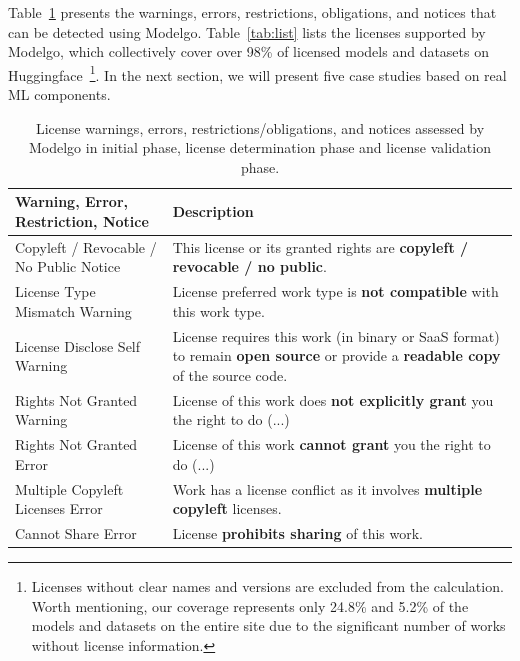 Table~\ref{tab:analysis} presents the warnings, errors, restrictions, obligations, and notices that can be detected using Modelgo.
Table~\ref{tab:list} lists the licenses supported by Modelgo, which collectively cover over 98\% of licensed models and datasets on Huggingface~\footnote{Licenses without clear names and versions are excluded from the calculation. Worth mentioning, our coverage represents only 24.8\% and 5.2\% of the models and datasets on the entire site due to the significant number of works without license information.}.
In the next section, we will present five case studies based on real ML components.


\begin{table}[t]
    \caption{License warnings, errors, restrictions/obligations, and notices assessed by Modelgo in \textcolor{Permissive}{initial phase}, \textcolor{Copyleft}{license determination phase} and license validation phase.}
    \scriptsize
    \label{tab:analysis}
    \begin{tabular}{|p{3.3cm}|p{4.3cm}|}

    \hline
    \rowcolor[gray]{.8}
    \textbf{Warning, Error, Restriction, Notice} & \textbf{Description} \\ \hline
    
    \textcolor{Permissive}{Copyleft / Revocable / No Public Notice} & This license or its granted rights are \textbf{copyleft / revocable / no public}. \\ \hline \hline
    
    \textcolor{Permissive}{License Type Mismatch Warning} & License preferred work type is \textbf{not compatible} with this work type. \\ \hline
    License Disclose Self Warning & License requires this work (in binary or SaaS format) to remain \textbf{open source} or provide a \textbf{readable copy} of the source code. \\ \hline
    Rights Not Granted Warning & License of this work does \textbf{not explicitly grant} you the right to do (...) \\ \hline \hline
    
    
    Rights Not Granted Error & License of this work \textbf{cannot grant} you the right to do (...) \\ \hline
    \textcolor{Copyleft}{Multiple Copyleft Licenses Error} & Work has a license conflict as it involves \textbf{multiple copyleft} licenses. \\ \hline
    Cannot Share Error & License \textbf{prohibits sharing} of this work. \\ \hline \hline


\end{tabular}
\end{table}
